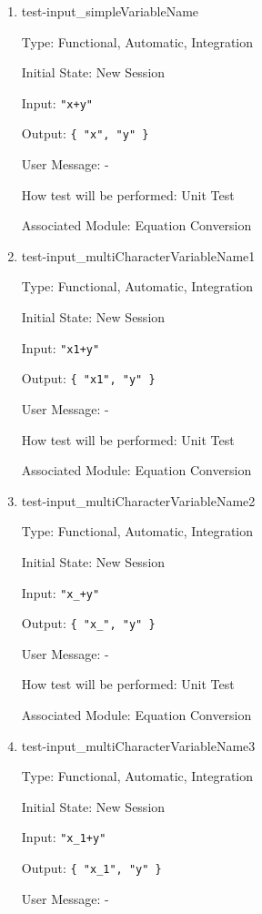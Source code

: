 \documentclass[12pt, titlepage]{article}
\begin{document}
\begin{enumerate}
	
	\item{test-input\_simpleVariableName}
	
	Type: Functional, Automatic, Integration
	
	Initial State: New Session
	
	Input: \texttt{"x+y"}
	
	Output: \texttt{\{ "x", "y" \}}
	
	User Message: - 
	
	How test will be performed: Unit Test
	
	Associated Module: Equation Conversion\\
	
	\item{test-input\_multiCharacterVariableName1}
	
	Type: Functional, Automatic, Integration
	
	Initial State: New Session
	
	Input: \texttt{"x1+y"}
	
	Output: \texttt{\{ "x1", "y" \}}
	
	User Message: - 
	
	How test will be performed: Unit Test
	
	Associated Module: Equation Conversion\\
	
	\item{test-input\_multiCharacterVariableName2}
	
	Type: Functional, Automatic, Integration
	
	Initial State: New Session
	
	Input: \texttt{"x\_+y"}
	
	Output: \texttt{\{ "x\_", "y" \}}
	
	User Message: - 
	
	How test will be performed: Unit Test
	
	Associated Module: Equation Conversion\\
	
	\item{test-input\_multiCharacterVariableName3}
	
	Type: Functional, Automatic, Integration
	
	Initial State: New Session
	
	Input: \texttt{"x\_1+y"}
	
	Output: \texttt{\{ "x\_1", "y" \}}
	
	User Message: - 
	

\end{enumerate}
\end{document}
